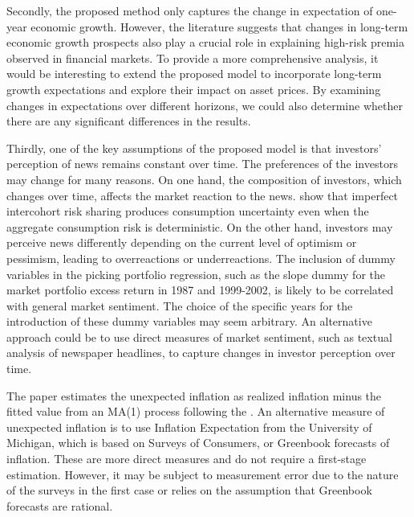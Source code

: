 \documentclass[12pt,a4paper]{ouparticle}
\begin{document}
Secondly, the proposed method only captures the change in expectation of one-year economic growth. However, the literature \citep{bansal2004risks} suggests that changes in long-term economic growth prospects also play a crucial role in explaining high-risk premia observed in financial markets.  To provide a more comprehensive analysis, it would be interesting to extend the proposed model to incorporate long-term growth expectations and explore their impact on asset prices. By examining changes in expectations over different horizons, we could also determine whether there are any significant differences in the results.

Thirdly, one of the key assumptions of the proposed model is that investors' perception of news remains constant over time. The preferences of the investors may change for many reasons. On one hand, the composition of investors, which changes over time, affects the market reaction to the news. \cite{garleanu2023heterogeneity} show that imperfect intercohort risk sharing produces consumption uncertainty even when the aggregate consumption risk is deterministic. On the other hand, investors may perceive news differently depending on the current level of optimism or pessimism, leading to overreactions or underreactions. The inclusion of dummy variables in the picking portfolio regression, such as the slope dummy for the market portfolio excess return in 1987 and 1999-2002, is likely to be correlated with general market sentiment. The choice of the specific years for the introduction of these dummy variables may seem arbitrary. An alternative approach could be to use direct measures of market sentiment, such as textual analysis of newspaper headlines, to capture changes in investor perception over time.

The paper estimates the unexpected inflation as realized
inflation minus the fitted value from an MA(1) process following the \cite{fama1984comparison}. An alternative measure of unexpected inflation is to use Inflation Expectation from the University of Michigan, which is based on Surveys of Consumers, or Greenbook forecasts of inflation. These are more direct measures and do not require a first-stage estimation. However, it may be subject to measurement error due to the nature of the surveys in the first case or relies on the assumption that Greenbook forecasts are rational. 

\end{document}
